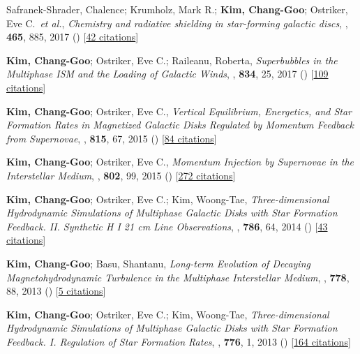 \item[{11.}]Safranek-Shrader, Chalence; Krumholz, Mark R.; \textbf{Kim, Chang-Goo}; Ostriker, Eve C.~\textit{et al.}, \textit{Chemistry and radiative shielding in star-forming galactic discs}, , \textbf{465}, 885, 2017 () [\href{http://adsabs.harvard.edu/abs/2017MNRAS.465..885S}{42 citations}]

\item[{10.}]\textbf{Kim, Chang-Goo}; Ostriker, Eve C.; Raileanu, Roberta, \textit{Superbubbles in the Multiphase ISM and the Loading of Galactic Winds}, , \textbf{834}, 25, 2017 () [\href{http://adsabs.harvard.edu/abs/2017ApJ...834...25K}{109 citations}]

\item[{9.}]\textbf{Kim, Chang-Goo}; Ostriker, Eve C., \textit{Vertical Equilibrium, Energetics, and Star Formation Rates in Magnetized Galactic Disks Regulated by Momentum Feedback from Supernovae}, , \textbf{815}, 67, 2015 () [\href{http://adsabs.harvard.edu/abs/2015ApJ...815...67K}{84 citations}]

\item[{8.}]\textbf{Kim, Chang-Goo}; Ostriker, Eve C., \textit{Momentum Injection by Supernovae in the Interstellar Medium}, , \textbf{802}, 99, 2015 () [\href{http://adsabs.harvard.edu/abs/2015ApJ...802...99K}{272 citations}]

\item[{7.}]\textbf{Kim, Chang-Goo}; Ostriker, Eve C.; Kim, Woong-Tae, \textit{Three-dimensional Hydrodynamic Simulations of Multiphase Galactic Disks with Star Formation Feedback. II. Synthetic H I 21 cm Line Observations}, , \textbf{786}, 64, 2014 () [\href{http://adsabs.harvard.edu/abs/2014ApJ...786...64K}{43 citations}]

\item[{6.}]\textbf{Kim, Chang-Goo}; Basu, Shantanu, \textit{Long-term Evolution of Decaying Magnetohydrodynamic Turbulence in the Multiphase Interstellar Medium}, , \textbf{778}, 88, 2013 () [\href{http://adsabs.harvard.edu/abs/2013ApJ...778...88K}{5 citations}]

\item[{5.}]\textbf{Kim, Chang-Goo}; Ostriker, Eve C.; Kim, Woong-Tae, \textit{Three-dimensional Hydrodynamic Simulations of Multiphase Galactic Disks with Star Formation Feedback. I. Regulation of Star Formation Rates}, , \textbf{776}, 1, 2013 () [\href{http://adsabs.harvard.edu/abs/2013ApJ...776....1K}{164 citations}]

